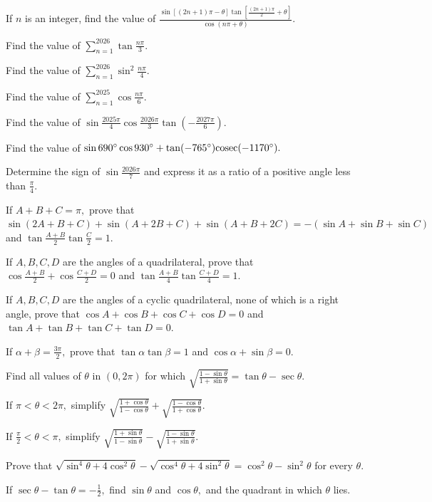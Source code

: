 \item If $n$ is an integer, find the value of $\frac{\sin\left[(2n + 1)\pi - \theta\right]\tan\left[\frac{(2n + 1)\pi}{2} +
    \theta\right]}{\cos(n\pi + \theta)}.$
\item Find the value of $\sum_{n = 1}^{2026}\tan\frac{n\pi}{3}.$
\item Find the value of $\sum_{n = 1}^{2026}\sin^2\frac{n\pi}{4}.$
\item Find the value of $\sum_{n = 1}^{2025}\cos\frac{n\pi}{6}.$
\item Find the value of $\sin\frac{2025\pi}{4}\cos\frac{2026\pi}{3}\tan\left(-\frac{2027\pi}{6}\right).$
\item Find the value of $\sin 690^\circ\cos 930^\circ + \tan(-765^\circ){\rm cosec}(-1170^\circ).$
\item Determine the sign of $\sin\frac{2026\pi}{7}$ and express it as a ratio of a positive angle less than $\frac{\pi}{4}.$
\item If $A + B + C = \pi,$ prove that $\sin(2A + B + C) + \sin(A + 2B + C) + \sin(A + B + 2C) = -(\sin A + \sin B + \sin C)$
  and $\tan\frac{A + B}{2}\tan\frac{C}{2} = 1.$
\item If $A, B, C, D$ are the angles of a quadrilateral, prove that $\cos\frac{A + B}{2} + \cos\frac{C + D}{2} = 0$ and
  $\tan\frac{A + B}{4}\tan\frac{C + D}{4} = 1.$
\item If $A, B, C, D$ are the angles of a cyclic quadrilateral, none of which is a right angle, prove that $\cos A + \cos B +
  \cos C + \cos D = 0$ and $\tan A + \tan B + \tan C + \tan D = 0.$
\item If $\alpha + \beta = \frac{3\pi}{2},$ prove that $\tan\alpha\tan\beta = 1$ and $\cos\alpha + \sin\beta = 0.$
\item Find all values of $\theta$ in $(0, 2\pi)$ for which $\sqrt{\frac{1 - \sin\theta}{1 + \sin\theta}} = \tan\theta -
  \sec\theta.$
\item If $\pi < \theta < 2\pi,$ simplify $\sqrt{\frac{1 + \cos\theta}{1 - \cos\theta}} + \sqrt{\frac{1 - \cos\theta}{1 +
      \cos\theta}}.$
\item If $\frac{\pi}{2} < \theta < \pi,$ simplify $\sqrt{\frac{1 + \sin\theta}{1 - \sin\theta}} - \sqrt{\frac{1 - \sin\theta}{1
      + \sin\theta}}.$
\item Prove that $\sqrt{\sin^4\theta + 4\cos^2\theta} - \sqrt{\cos^4\theta + 4\sin^2\theta} = \cos^2\theta - \sin^2\theta$ for
  every $\theta.$
\item If $\sec\theta - \tan\theta = -\frac{1}{2},$ find $\sin\theta$ and $\cos\theta,$ and the quadrant in which $\theta$ lies.
